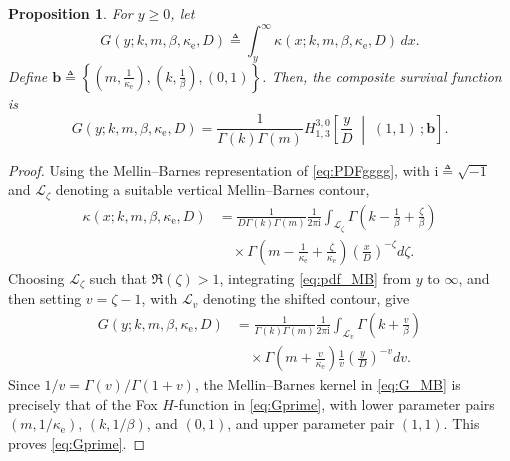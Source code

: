 \documentclass[lettersize,journal]{IEEEtran}
\newtheorem{proposition}{Proposition}
\begin{document}
\begin{proposition}\label{prop:3prime}
For \(y\geq0\), let
\[
G(y;k,m,\beta,\kappa_{\mathrm e},D)
\triangleq
\int_y^\infty
\kappa(x;k,m,\beta,\kappa_{\mathrm e},D)\,dx .
\]
Define \(\mathbf b\triangleq\left\{\left(m,\frac{1}{\kappa_{\mathrm e}}\right),\left(k,\frac{1}{\beta}\right),(0,1)\right\}\). Then, the composite survival function is
\begin{equation}
G(y;k,m,\beta,\kappa_{\mathrm e},D)
=
\frac{1}{\Gamma(k)\Gamma(m)}
H^{3,0}_{1,3}\!\left[
\frac{y}{D}\;\middle|\;(1,1)\,;\mathbf b
\right].
\label{eq:Gprime}
\end{equation}
\end{proposition}

\begin{proof}
Using the Mellin--Barnes representation of \eqref{eq:PDFgggg}, with \(\mathrm i\triangleq\sqrt{-1}\) and \(\mathcal L_\zeta\) denoting a suitable vertical Mellin--Barnes contour,
\begin{equation}
\begin{aligned}
\kappa(x;k,m,\beta,\kappa_{\mathrm e},D)
&=
\frac{1}{D\Gamma(k)\Gamma(m)}
\frac{1}{2\pi\mathrm i}
\int_{\mathcal L_\zeta}
\Gamma\!\left(k-\frac{1}{\beta}+\frac{\zeta}{\beta}\right)\\
&\quad\times
\Gamma\!\left(m-\frac{1}{\kappa_{\mathrm e}}+
\frac{\zeta}{\kappa_{\mathrm e}}\right)
\left(\frac{x}{D}\right)^{-\zeta}d\zeta .
\end{aligned}
\label{eq:pdf_MB}
\end{equation}
Choosing \(\mathcal L_\zeta\) such that \(\Re(\zeta)>1\), integrating \eqref{eq:pdf_MB} from \(y\) to \(\infty\), and then setting \(v=\zeta-1\), with \(\mathcal L_v\) denoting the shifted contour, give
\begin{equation}
\begin{aligned}
G(y;k,m,\beta,\kappa_{\mathrm e},D)
&=
\frac{1}{\Gamma(k)\Gamma(m)}
\frac{1}{2\pi\mathrm i}
\int_{\mathcal L_v}
\Gamma\!\left(k+\frac{v}{\beta}\right)\\
&\quad\times
\Gamma\!\left(m+\frac{v}{\kappa_{\mathrm e}}\right)
\frac{1}{v}
\left(\frac{y}{D}\right)^{-v}dv .
\end{aligned}
\label{eq:G_MB}
\end{equation}
Since \(1/v=\Gamma(v)/\Gamma(1+v)\), the Mellin--Barnes kernel in
\eqref{eq:G_MB} is precisely that of the Fox \(H\)-function in
\eqref{eq:Gprime}, with lower parameter pairs
\((m,1/\kappa_{\mathrm e})\), \((k,1/\beta)\), and \((0,1)\), and upper parameter pair \((1,1)\). This proves \eqref{eq:Gprime}.
\end{proof}
\end{document}
